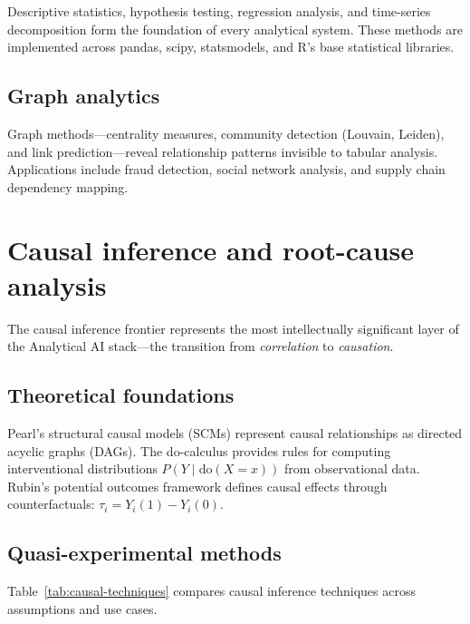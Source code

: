 \documentclass[preprint,12pt,authoryear]{elsarticle}
\theoremstyle{definition}
\begin{document}
Descriptive statistics, hypothesis testing, regression analysis, and time-series decomposition form the foundation of every analytical system. These methods are implemented across pandas, scipy, statsmodels, and R's base statistical libraries.

\subsection{Graph analytics}

Graph methods---centrality measures, community detection (Louvain, Leiden), and link prediction---reveal relationship patterns invisible to tabular analysis. Applications include fraud detection, social network analysis, and supply chain dependency mapping.

\section{Causal inference and root-cause analysis}\label{sec:causal}

The causal inference frontier represents the most intellectually significant layer of the Analytical AI stack---the transition from \emph{correlation} to \emph{causation}.

\subsection{Theoretical foundations}

Pearl's structural causal models (SCMs) \citep{pearl2009causality} represent causal relationships as directed acyclic graphs (DAGs). The do-calculus provides rules for computing interventional distributions $P(Y \mid \text{do}(X=x))$ from observational data. Rubin's potential outcomes framework \citep{rubin2005causal} defines causal effects through counterfactuals: $\tau_i = Y_i(1) - Y_i(0)$.

\subsection{Quasi-experimental methods}

Table~\ref{tab:causal-techniques} compares causal inference techniques across assumptions and use cases.
\end{document}

